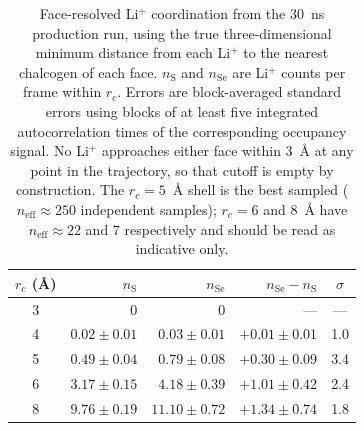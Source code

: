\begin{table}[htbp]
\caption{Face-resolved Li$^+$ coordination from the 30~ns production run,
using the true three-dimensional minimum distance from each Li$^+$ to the
nearest chalcogen of each face. $n_{\mathrm{S}}$ and $n_{\mathrm{Se}}$ are
Li$^+$ counts per frame within $r_c$. Errors are block-averaged standard
errors using blocks of at least five integrated autocorrelation times of
the corresponding occupancy signal. No Li$^+$ approaches either face
within 3~\AA{} at any point in the trajectory, so that cutoff is empty by
construction. The $r_c = 5$~\AA{} shell is the best sampled
($n_{\mathrm{eff}} \approx 250$ independent samples); $r_c = 6$ and
8~\AA{} have $n_{\mathrm{eff}} \approx 22$ and $7$ respectively and
should be read as indicative only.}
\label{tab:contacts}
\centering
\begin{tabular}{crrrc}
\hline
$r_c$ (\AA) & $n_{\mathrm{S}}$ & $n_{\mathrm{Se}}$ & $n_{\mathrm{Se}}-n_{\mathrm{S}}$ & $\sigma$ \\
\hline
3 & 0 & 0 & --- & --- \\
4 & $0.02 \pm 0.01$ & $0.03 \pm 0.01$ & $+0.01 \pm 0.01$ & 1.0 \\
5 & $0.49 \pm 0.04$ & $0.79 \pm 0.08$ & $+0.30 \pm 0.09$ & 3.4 \\
6 & $3.17 \pm 0.15$ & $4.18 \pm 0.39$ & $+1.01 \pm 0.42$ & 2.4 \\
8 & $9.76 \pm 0.19$ & $11.10 \pm 0.72$ & $+1.34 \pm 0.74$ & 1.8 \\
\hline
\end{tabular}
\end{table}

